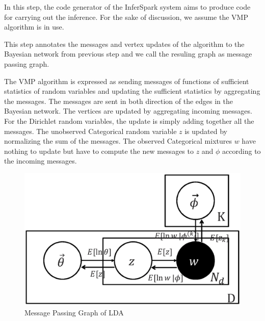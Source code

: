 In this step, the code generator of the InferSpark system
aims to produce code for carrying out the inference.
For the sake of discussion,
we assume the VMP algorithm is in use.

This step annotates the messages and vertex updates of the algorithm to the
Bayesian network from previous step and we call the resuling graph as message
passing graph.

The VMP algorithm is expressed as sending messages of functions of sufficient
statistics of random variables and updating the sufficient statistics by
aggregating the messages. The messages are sent in both direction of the edges
in the Bayesian network. The vertices are updated by aggregating incoming
messages. For the Dirichlet random variables, the update is simply adding
together all the messages. The unobserved Categorical random variable $z$ is
updated by normalizing the sum of the messages. The observed Categorical
mixtures $w$ have nothing to update but have to compute the new messages to $z$
and $\phi$ according to the incoming messages.

\begin{figure}[h]
	\centering	
	\includegraphics[scale=0.3]{figs/lda_mpg.eps}
	\caption{Message Passing Graph of LDA}
	\label{fig:lda_mpg}
\end{figure}


